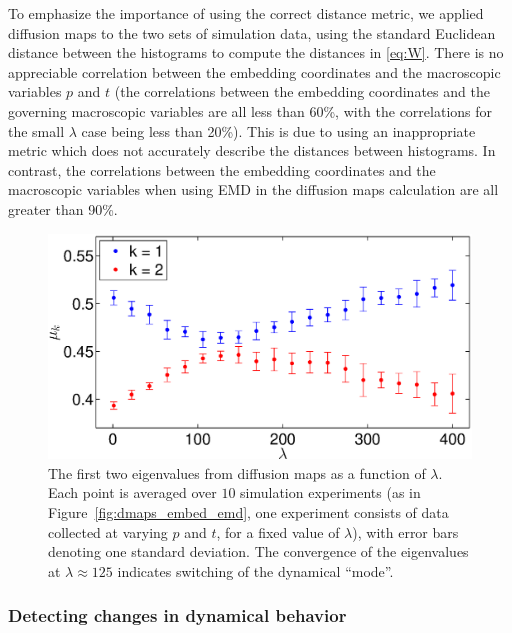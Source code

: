 \documentclass[preprint]{elsarticle}
\begin{document}

To emphasize the importance of using the correct distance metric, we applied diffusion maps to the two sets of simulation data, using the standard Euclidean distance between the histograms to compute the distances in \eqref{eq:W}.
%
There is no appreciable correlation between the embedding coordinates and the macroscopic variables $p$ and $t$ (the correlations between the embedding coordinates and the governing macroscopic variables are all  less than 60\%, with the correlations for the small $\lambda$ case being less than 20\%). 
%
This is due to using an inappropriate metric which does not accurately describe the distances between histograms.
%
In contrast, the correlations between the embedding coordinates and the macroscopic variables when using EMD in the diffusion maps calculation are all greater than 90\%.



\begin{figure}[t] 
\centering
\includegraphics[width=\textwidth]{detect_change_eigenvalues}
\caption{The first two eigenvalues from diffusion maps as a function of $\lambda$. Each point is averaged over $10$ simulation experiments (as in Figure~\ref{fig:dmaps_embed_emd}, one experiment consists of data collected at varying $p$ and $t$, for a fixed value of $\lambda$), with error bars denoting one standard deviation. 
The convergence of the eigenvalues at $\lambda \approx 125$ indicates switching of the dynamical ``mode''.}
\label{fig:detect_change}
\end{figure}

\subsubsection{Detecting changes in dynamical behavior}
\end{document}
